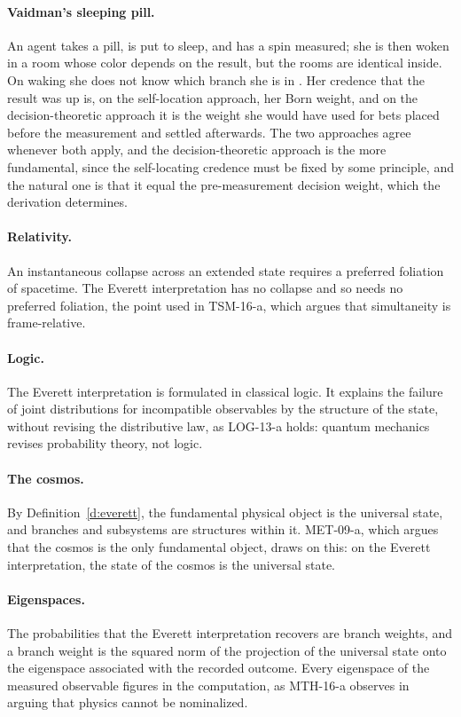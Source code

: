 \documentclass{situationist-preprint}
\begin{document}
\paragraph{Vaidman's sleeping pill.} An agent takes a pill, is put to sleep, and has a spin measured; she is then woken in a room whose color depends on the result, but the rooms are identical inside. On waking she does not know which branch she is in \citep{Vaidman1998}. Her credence that the result was up is, on the self-location approach, her Born weight, and on the decision-theoretic approach it is the weight she would have used for bets placed before the measurement and settled afterwards. The two approaches agree whenever both apply, and the decision-theoretic approach is the more fundamental, since the self-locating credence must be fixed by some principle, and the natural one is that it equal the pre-measurement decision weight, which the derivation determines.

\paragraph{Relativity.} An instantaneous collapse across an extended state requires a preferred foliation of spacetime. The Everett interpretation has no collapse and so needs no preferred foliation, the point used in TSM-16-a, which argues that simultaneity is frame-relative.

\paragraph{Logic.} The Everett interpretation is formulated in classical logic. It explains the failure of joint distributions for incompatible observables by the structure of the state, without revising the distributive law, as LOG-13-a holds: quantum mechanics revises probability theory, not logic.

\paragraph{The cosmos.} By Definition~\ref{d:everett}, the fundamental physical object is the universal state, and branches and subsystems are structures within it. MET-09-a, which argues that the cosmos is the only fundamental object, draws on this: on the Everett interpretation, the state of the cosmos is the universal state.

\paragraph{Eigenspaces.} The probabilities that the Everett interpretation recovers are branch weights, and a branch weight is the squared norm of the projection of the universal state onto the eigenspace associated with the recorded outcome. Every eigenspace of the measured observable figures in the computation, as MTH-16-a observes in arguing that physics cannot be nominalized.
\end{document}

